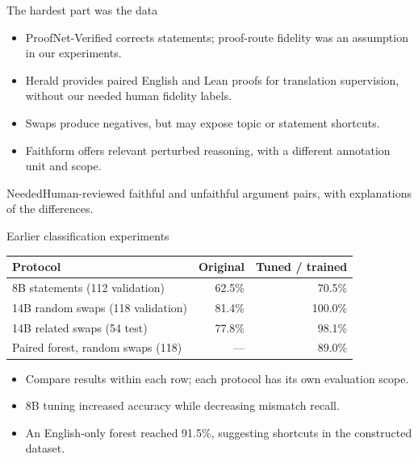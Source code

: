 \documentclass[aspectratio=169,11pt]{beamer}
\begin{document}
\begin{frame}{The hardest part was the data}
\begin{itemize}
\item ProofNet-Verified corrects statements; proof-route fidelity was an assumption in our experiments.
\item Herald provides paired English and Lean proofs for translation supervision, without our needed human fidelity labels.
\item Swaps produce negatives, but may expose topic or statement shortcuts.
\item Faithform offers relevant perturbed reasoning, with a different annotation unit and scope.
\end{itemize}
\begin{block}{Needed}Human-reviewed faithful and unfaithful argument pairs, with explanations of the differences.\end{block}
\end{frame}
\begin{frame}{Earlier classification experiments}
\small\centering
\begin{tabular}{lrr}
\toprule Protocol & Original & Tuned / trained\\\midrule
8B statements (112 validation) & 62.5\% & 70.5\%\\
14B random swaps (118 validation) & 81.4\% & 100.0\%\\
14B related swaps (54 test) & 77.8\% & 98.1\%\\
Paired forest, random swaps (118) & --- & 89.0\%\\\bottomrule
\end{tabular}
\vspace{.4cm}
\begin{itemize}\item Compare results within each row; each protocol has its own evaluation scope.
\item 8B tuning increased accuracy while decreasing mismatch recall.
\item An English-only forest reached 91.5\%, suggesting shortcuts in the constructed dataset.\end{itemize}
\end{frame}
\end{document}
